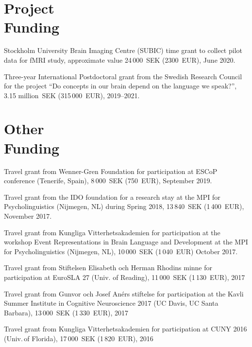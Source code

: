 \documentclass[margin, 11pt]{res} %
\begin{document}
\begin{resume}


\section{\sc Project \\Funding}


Stockholm University Brain Imaging Centre (SUBIC) time grant to collect pilot data for fMRI study, approximate value 24\,000~SEK (2300~EUR), June 2020.

Three-year International Postdoctoral grant from the Swedish Research Council for the project ``Do concepts in our brain depend on the language we speak?'', 3.15 million~SEK (315\,000~EUR), 2019--2021.

\section{\sc Other \\Funding}


Travel grant from Wenner-Gren Foundation for participation at ESCoP conference (Tenerife, Spain), 8\,000~SEK (750~EUR), September 2019.

Travel grant from the IDO foundation for a research stay at the MPI for Psycholinguistics (Nijmegen, NL) during Spring 2018, 13\,840~SEK (1\,400~EUR), November 2017.

Travel grant from Kungliga Vitterhetsakademien for participation at the workshop Event Representations in Brain Language and Development at the MPI for Psycholinguistics (Nijmegen, NL), 10\,000~SEK (1\,040~EUR) October 2017.

Travel grant from Stiftelsen Elisabeth och Herman Rhodins minne for participation at EuroSLA 27 (Univ. of Reading), 11\,000~SEK (1\,130~EUR), 2017

Travel grant from Gunvor och Josef An\'{e}rs stiftelse for participation at the Kavli Summer Institute in Cognitive Neuroscience 2017 (UC Davis, UC Santa Barbara), 13\,000~SEK (1\,330~EUR), 2017

Travel grant from Kungliga Vitterhetsakademien for participation at CUNY 2016 (Univ.\,of Florida), 17\,000~SEK (1\,820~EUR), 2016


\end{resume}
\end{document}
